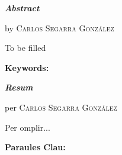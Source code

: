 \vspace*{2.00cm}
\begin{center}

    \LARGE
    \textit{\textbf{Abstract}} \label{sec:abstract}

    \vspace{0.5cm}

    \large
    \textbf{\titleEN}

    by \textsc{Carlos Segarra Gonz\'alez}
\end{center}

\vspace{0.5cm}

\normalsize
To be filled

\vspace{0.5cm}

\textbf{Keywords:} 

\vfill
\pagebreak

\vspace*{2cm}
\begin{center}
    \LARGE
    \textit{\textbf{Resum}} 

    \vspace{0.5cm}

    \large
    \textbf{\titleEN}

    per \textsc{Carlos Segarra Gonz\'alez}
\end{center}

\vspace{0.5cm}

\normalsize

Per omplir...

\vspace{0.5cm}

\textbf{Paraules Clau:} 

\vfill
